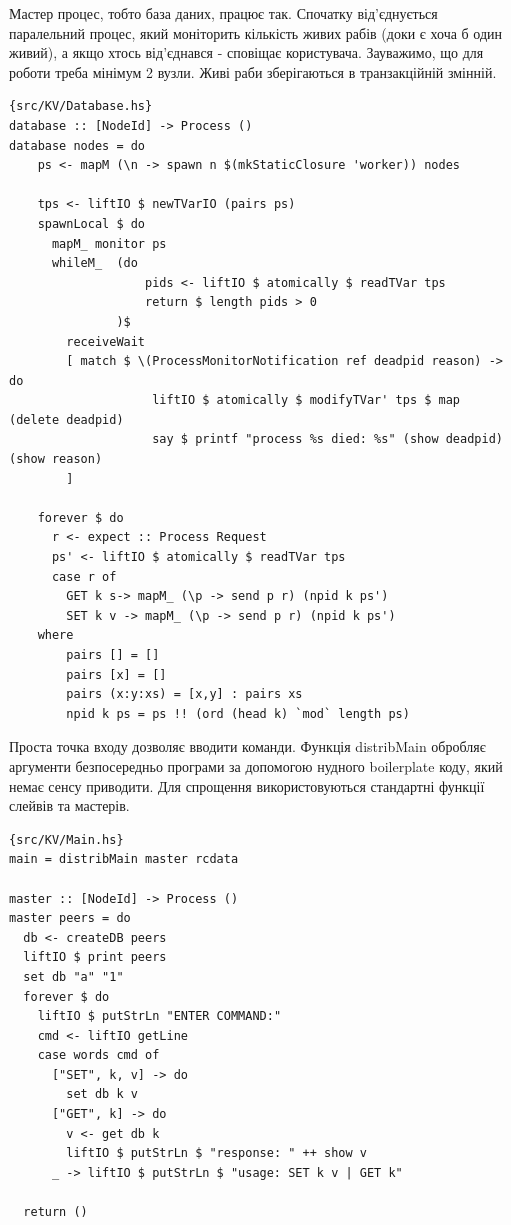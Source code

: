 \documentclass[12pt]{article}
\begin{document}
Мастер процес, тобто база даних, працює так. Спочатку від'єднується паралельний 
процес, який моніторить кількість живих рабів (доки є хоча б один живий), 
а якщо хтось від'єднався - сповіщає користувача. Зауважимо, що для роботи
треба мінімум 2 вузли. Живі раби зберігаються в транзакційній змінній.\\

\begin{lstlisting}{src/KV/Database.hs}
database :: [NodeId] -> Process ()
database nodes = do
    ps <- mapM (\n -> spawn n $(mkStaticClosure 'worker)) nodes

    tps <- liftIO $ newTVarIO (pairs ps)
    spawnLocal $ do 
      mapM_ monitor ps 
      whileM_  (do
                   pids <- liftIO $ atomically $ readTVar tps
                   return $ length pids > 0
               )$
        receiveWait 
        [ match $ \(ProcessMonitorNotification ref deadpid reason) -> do
                    liftIO $ atomically $ modifyTVar' tps $ map (delete deadpid)
                    say $ printf "process %s died: %s" (show deadpid) (show reason)
        ]                      
                   
    forever $ do
      r <- expect :: Process Request
      ps' <- liftIO $ atomically $ readTVar tps
      case r of
        GET k s-> mapM_ (\p -> send p r) (npid k ps') 
        SET k v -> mapM_ (\p -> send p r) (npid k ps') 
    where
        pairs [] = []
        pairs [x] = []
        pairs (x:y:xs) = [x,y] : pairs xs
        npid k ps = ps !! (ord (head k) `mod` length ps)
\end{lstlisting}

Проста точка входу дозволяє вводити команди. Функція distribMain обробляє аргументи
безпосередньо програми за допомогою нудного boilerplate коду, який немає сенсу приводити.
Для спрощення використовуються стандартні функції слейвів та мастерів.\\

\begin{lstlisting}{src/KV/Main.hs}
main = distribMain master rcdata

master :: [NodeId] -> Process ()
master peers = do
  db <- createDB peers
  liftIO $ print peers
  set db "a" "1"
  forever $ do
    liftIO $ putStrLn "ENTER COMMAND:"
    cmd <- liftIO getLine
    case words cmd of
      ["SET", k, v] -> do
        set db k v
      ["GET", k] -> do
        v <- get db k
        liftIO $ putStrLn $ "response: " ++ show v
      _ -> liftIO $ putStrLn $ "usage: SET k v | GET k"

  return ()
\end{lstlisting}
\end{document}
